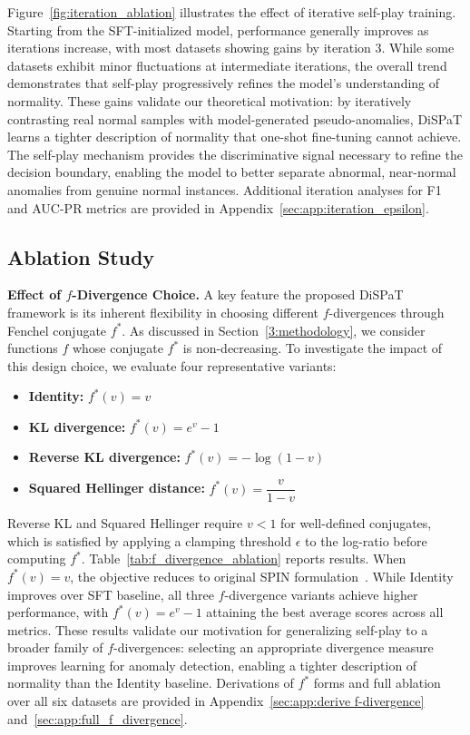 Figure~\ref{fig:iteration_ablation} illustrates the effect of iterative self-play training. Starting from the SFT-initialized model, performance generally improves as iterations increase, with most datasets showing gains by iteration 3. While some datasets exhibit minor fluctuations at intermediate iterations, the overall trend demonstrates that self-play progressively refines the model's understanding of normality. These gains validate our theoretical motivation: by iteratively contrasting real normal samples with model-generated pseudo-anomalies, DiSPaT learns a tighter description of normality that one-shot fine-tuning cannot achieve. The self-play mechanism provides the discriminative signal necessary to refine the decision boundary, enabling the model to better separate abnormal, near-normal anomalies from genuine normal instances. Additional iteration 
analyses for F1 and AUC-PR metrics are provided in Appendix~\ref{sec:app:iteration_epsilon}.


\subsection{Ablation Study} \label{sec:ablation}

\textbf{Effect of $f$-Divergence Choice.} A key feature the proposed DiSPaT framework is its inherent flexibility in choosing different $f$-divergences through Fenchel conjugate $f^*$. As discussed in Section~\ref{3:methodology}, we consider functions $f$ whose conjugate $f^*$ is non-decreasing. To investigate the impact of this design choice, we evaluate four representative variants:
\begin{itemize}
    \setlength\itemsep{0em}
    \item \textbf{Identity:} $f^*(v) = v$
    \item \textbf{KL divergence:} $f^*(v) = e^v - 1$
    \item \textbf{Reverse KL divergence:} $f^*(v) = -\log(1 - v)$
    \item \textbf{Squared Hellinger distance:} $f^*(v) = \dfrac{v}{1-v}$
\end{itemize}
Reverse KL and Squared Hellinger require $v < 1$ for well-defined conjugates, which is satisfied by applying a clamping threshold $\epsilon$ to the log-ratio before computing $f^*$. Table~\ref{tab:f_divergence_ablation} reports results. When $f^*(v) = v$, the objective reduces to original SPIN formulation~\citep{chen2024self}. While Identity improves over SFT baseline, all three $f$-divergence variants achieve higher performance, with $f^*(v) = e^v - 1$ attaining the best average scores across all metrics. These results validate our motivation for generalizing self-play to a broader family of $f$-divergences: selecting an appropriate divergence measure improves learning for anomaly detection, enabling a tighter description of normality than the Identity baseline. Derivations of $f^*$ forms and full ablation over all six datasets are provided in Appendix~\ref{sec:app:derive f-divergence} and~\ref{sec:app:full_f_divergence}.



